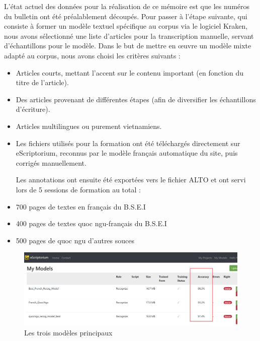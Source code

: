 L'état actuel des données pour la réalisation de ce mémoire est que les numéros du bulletin ont été préalablement découpés. Pour passer à l'étape suivante, qui consiste à former un modèle textuel spécifique au corpus via le logiciel Kraken, nous avons sélectionné une liste d'articles pour la transcription manuelle, servant d'échantillons pour le modèle. Dans le but de mettre en œuvre un modèle mixte adapté au corpus, nous avons choisi les critères suivants :

\begin{itemize}
    \item Articles courts, mettant l'accent sur le contenu important (en fonction du titre de l'article).
    \item Des articles provenant de différentes étapes (afin de diversifier les échantillons d'écriture).
    \item Articles multilingues ou purement vietnamiens.
    \item Les fichiers utilisés pour la formation ont été téléchargés directement sur eScriptorium, reconnus par le modèle français automatique du site, puis corrigés manuellement. 

Les annotations ont ensuite été exportées vers le fichier ALTO et ont servi lors de 5 sessions de formation au total :
\end{itemize}

\begin{itemize}
    \item 700 pages de textes en français du B.S.E.I
    \item 400 pages de textes quoc ngu-français du B.S.E.I
    \item 500 pages de quoc ngu d'autres souces
\end{itemize}

\begin{figure}
    \centering
    \includegraphics[width=1\linewidth]{img/model3.PNG}
    \caption{Les trois modèles principaux}
    \label{fig:enter-label}
\end{figure}

